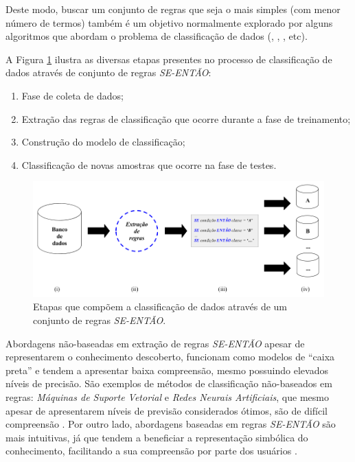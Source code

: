 \documentclass[
	12pt,				%
	openany,			%
	oneside,	
	a4paper,			%
	brazil,				%
	]{unimontes-ppgmsc-abntex2}
\begin{document}
Deste modo, buscar um conjunto de regras que seja o mais simples (com menor número de termos) também é um objetivo normalmente explorado por alguns algoritmos que abordam o problema de classificação de dados (, , , etc).

A Figura \ref{fig:modeloPSO} ilustra as diversas etapas presentes no processo de classificação de dados através de conjunto de regras {\em SE-ENTÃO}: 

\begin{enumerate}[label={(\roman*)}]
\item Fase de coleta de dados;
\item Extração das regras de classificação que ocorre durante a fase de treinamento;
\item Construção do modelo de classificação;
\item Classificação de novas amostras que ocorre na fase de testes.
\end{enumerate}

\begin{figure}[ht]
\centering
\includegraphics[scale=.4]{img/modelo}
\caption{Etapas que compõem a classificação de dados através de um conjunto de regras {\em SE-ENTÃO}.}
\label{fig:modeloPSO}
\end{figure}

Abordagens não-baseadas em extração de regras {\em SE-ENTÃO} apesar de representarem o conhecimento descoberto, funcionam como modelos de ``caixa preta'' e tendem a apresentar baixa compreensão, mesmo possuindo elevados níveis de precisão. São exemplos de métodos de classificação não-baseados em regras: {\em Máquinas de Suporte Vetorial} e {\em Redes Neurais Artificiais}, que mesmo apesar de apresentarem níveis de previsão considerados ótimos, são de  difícil compreensão \cite{Hassani_2013}. Por outro lado, abordagens baseadas em regras {\em SE-ENTÃO} são mais intuitivas, já que tendem a beneficiar a representação simbólica do conhecimento, facilitando a sua compreensão por parte dos usuários \cite{Wang_2007}.
\end{document}

